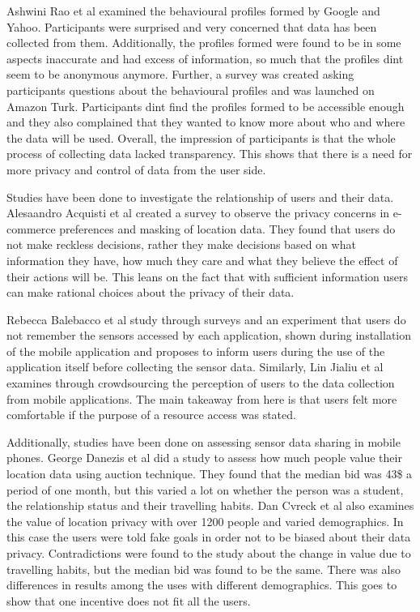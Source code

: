 Ashwini Rao et al \cite{rao2015they} examined the behavioural profiles formed by Google and Yahoo. Participants were surprised and very concerned that data has been collected from them. Additionally, the profiles formed were found to be in some aspects inaccurate and had excess of information, so much that the profiles dint seem to be anonymous anymore. Further, a survey was created asking participants questions about the behavioural profiles and was launched on Amazon Turk. Participants dint find the profiles formed to be accessible enough and they also complained that they wanted to know more about who and where the data will be used. Overall, the impression of participants is that the whole process of collecting data lacked transparency. This shows that there is a need for more privacy and control of data from the user side.

Studies have been done to investigate the relationship of users and their data. Alesaandro Acquisti et al \cite{acquisti2005privacy} created a survey to observe the privacy concerns in e-commerce preferences and masking of location data. They found that users do not make reckless decisions, rather they make decisions based on what information they have, how much they care and what they believe the effect of their actions will be. This leans on the fact that with sufficient information users can make rational choices about the privacy of their data. 

Rebecca Balebacco et al \cite{balebako2015impact} study through surveys and an experiment that users do not remember the sensors accessed by each application, shown during installation of the mobile application and proposes to inform users during the use of the application itself before collecting the sensor data. Similarly, Lin Jialiu et al \cite{lin2012expectation} examines through crowdsourcing the perception of users to the data collection from mobile applications. The main takeaway from here is that users felt more comfortable if the purpose of a resource access was stated.

Additionally, studies have been done on assessing sensor data sharing in mobile phones. George Danezis et al \cite{danezis2005much} did a study to assess how much people value their location data using auction technique. They found that the median bid was 43\$ a period of one month, but this varied a lot on whether the person was a student, the relationship status and their travelling habits.  Dan Cvreck et al \cite{cvrcek2006study} also examines the value of location privacy with over 1200 people and varied demographics. In this case the users were told fake goals in order not to be biased about their data privacy. Contradictions were found to the study \cite{danezis2005much} about the change in value due to travelling habits, but the median bid was found to be the same. There was also differences in results among the uses with different demographics. This goes to show that one incentive does not fit all the users.

